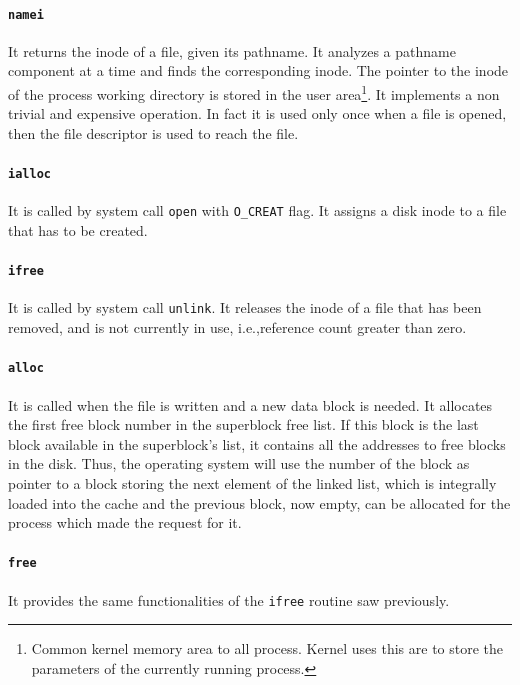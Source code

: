 \paragraph{\texttt{namei}} It returns the inode of a file, given its pathname. It analyzes a pathname component at a time and finds the corresponding inode. The pointer to the inode of the process working directory is stored in the user area\footnote{Common kernel memory area to all process. Kernel uses this are to store the parameters of the currently running process.}. It implements a non trivial and expensive operation. In fact it is used only once when a file is opened, then the file descriptor is used to reach the file.

\paragraph{\texttt{ialloc}} It is called by system call \texttt{open} with \texttt{O\_CREAT} flag. It assigns a disk inode to a file that has to be created.

\paragraph{\texttt{ifree}} It is called by system call \texttt{unlink}. It releases the inode of a file that has been removed, and is not currently in use, i.e.,\@ reference count greater than zero.

\paragraph{\texttt{alloc}} It is called when the file is written and a new data block is needed. It allocates the first free block number in the superblock free list. If this block is the last block available in the superblock's list, it contains all the addresses to free blocks in the disk. Thus, the operating system will use the number of the block as pointer to a block storing the next element of the linked list, which is integrally loaded into the cache and the previous block, now empty, can be allocated for the process which made the request for it.

\paragraph{\texttt{free}} It provides the same functionalities of the \texttt{ifree} routine saw previously.

